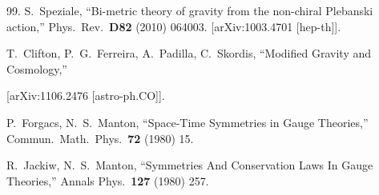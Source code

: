 \documentclass [prd,reprint,eqsecnum,nofootinbib]  {revtex4-1}
\begin{document}
\begin{thebibliography}{99.}
  S.~Speziale,
  ``Bi-metric theory of gravity from the non-chiral Plebanski action,''
  Phys.\ Rev.\  {\bf D82 } (2010)  064003.
  [arXiv:1003.4701 [hep-th]].

  T.~Clifton, P.~G.~Ferreira, A.~Padilla, C.~Skordis,
 ``Modified Gravity and Cosmology,''

  [arXiv:1106.2476 [astro-ph.CO]].




















  P.~Forgacs, N.~S.~Manton,
  ``Space-Time Symmetries in Gauge Theories,''
  Commun.\ Math.\ Phys.\  {\bf 72 } (1980)  15.

  R.~Jackiw, N.~S.~Manton,
  ``Symmetries And Conservation Laws In Gauge Theories,''
  Annals Phys.\  {\bf 127 } (1980)  257.

\end{thebibliography}
\end{document}
